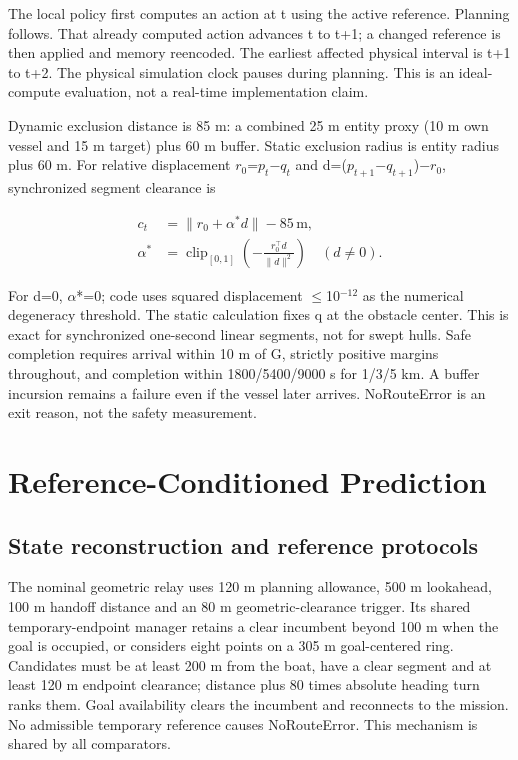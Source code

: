 \documentclass[conference]{IEEEtran}
\begin{document}
The local policy first computes an action at t using the active reference. Planning follows. That already computed action advances t to t+1; a changed reference is then applied and memory reencoded. The earliest affected physical interval is t+1 to t+2. The physical simulation clock pauses during planning. This is an ideal-compute evaluation, not a real-time implementation claim.

Dynamic exclusion distance is 85 m: a combined 25 m entity proxy (10 m own vessel and 15 m target) plus 60 m buffer. Static exclusion radius is entity radius plus 60 m. For relative displacement $r_0$=$p_t$\ensuremath{-}$q_t$ and d=($p_{t+1}$\ensuremath{-}$q_{t+1}$)\ensuremath{-}$r_0$, synchronized segment clearance is

\begin{equation}\label{eq:1}
\begin{aligned}c_t&=\|r_0+\alpha^*d\|-85\,\mathrm{m},\\\alpha^*&=\operatorname{clip}_{[0,1]}\!\left(-\frac{r_0^\top d}{\|d\|^2}\right)\quad(d\ne0).\end{aligned}
\end{equation}

For d=0, \ensuremath{\alpha}*=0; code uses squared displacement \ensuremath{\le}10$^{-12}$ as the numerical degeneracy threshold. The static calculation fixes q at the obstacle center. This is exact for synchronized one-second linear segments, not for swept hulls. Safe completion requires arrival within 10 m of G, strictly positive margins throughout, and completion within 1800/5400/9000 s for 1/3/5 km. A buffer incursion remains a failure even if the vessel later arrives. NoRouteError is an exit reason, not the safety measurement.

\section{Reference-Conditioned Prediction}

\subsection{State reconstruction and reference protocols}

The nominal geometric relay uses 120 m planning allowance, 500 m lookahead, 100 m handoff distance and an 80 m geometric-clearance trigger. Its shared temporary-endpoint manager retains a clear incumbent beyond 100 m when the goal is occupied, or considers eight points on a 305 m goal-centered ring. Candidates must be at least 200 m from the boat, have a clear segment and at least 120 m endpoint clearance; distance plus 80 times absolute heading turn ranks them. Goal availability clears the incumbent and reconnects to the mission. No admissible temporary reference causes NoRouteError. This mechanism is shared by all comparators.
\end{document}
